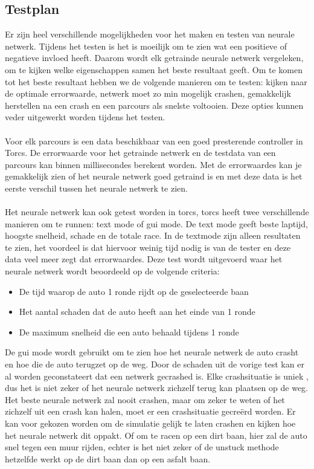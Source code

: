 \pagebreak
\subsection{Testplan}
\label{testplan}
Er zijn heel verschillende mogelijkheden voor het maken en testen van neurale netwerk. Tijdens het testen is het is moeilijk om te zien wat een positieve of negatieve invloed heeft. Daarom wordt elk getrainde neurale netwerk vergeleken, om te kijken welke eigenschappen samen het beste resultaat geeft. Om te komen tot het beste resultaat hebben we de volgende manieren om te testen: kijken naar de optimale errorwaarde, netwerk moet zo min mogelijk crashen, gemakkelijk herstellen na een crash en een parcours als snelste voltooien. Deze opties kunnen veder uitgewerkt worden tijdens het testen. \\\\
Voor elk parcours is een data beschikbaar van een goed presterende controller in Torcs. De errorwaarde voor het getrainde netwerk en de testdata van een parcours kan binnen millisecondes berekent worden. Met de errorwaardes kan je gemakkelijk zien of het neurale netwerk goed getraind is en met deze data is het eerste verschil tussen het neurale netwerk te zien. \\\\
Het neurale netwerk kan ook getest worden in torcs, torcs heeft twee verschillende manieren om te runnen: text mode of gui mode. De text mode geeft beste laptijd, hoogste snelheid, schade en de totale race. In de textmode zijn alleen resultaten te zien, het voordeel is dat hiervoor weinig tijd nodig is van de tester en deze data veel meer zegt dat errorwaardes. Deze test wordt uitgevoerd waar het neurale netwerk wordt beoordeeld op de volgende criteria:
\begin{itemize}
\item De tijd waarop de auto 1 ronde rijdt op de geselecteerde baan
\item Het aantal schaden dat de auto heeft aan het einde van 1 ronde
\item De maximum snelheid die een auto behaald tijdens 1 ronde
\end{itemize}
\noindent De gui mode wordt gebruikt om te zien hoe het neurale netwerk de auto crasht en hoe die de auto terugzet op de weg. Door de schaden uit de vorige test kan er al worden geconstateert dat een netwerk gecrashed is. Elke crashsituatie is uniek , dus het is niet zeker of het neurale netwerk zichzelf terug kan plaatsen op de weg. Het beste neurale netwerk zal nooit crashen, maar om zeker te weten of het zichzelf uit een crash kan halen, moet er een crashsituatie gecre\"erd worden. Er kan voor gekozen worden om de simulatie gelijk te laten crashen en kijken hoe het neurale netwerk dit oppakt. Of om te racen op een dirt baan, hier zal de auto snel tegen een muur rijden, echter is het niet zeker of de unstuck methode hetzelfde werkt op de dirt baan dan op een asfalt baan.\\\\
